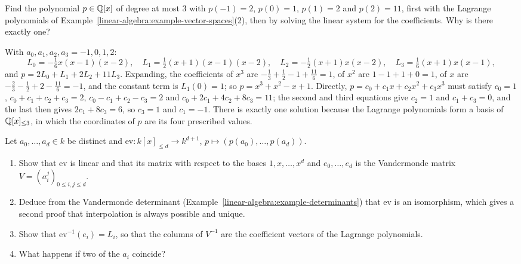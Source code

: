 \begin{exercise}\label{linear-algebra:exercise-lagrange-compute}
Find the polynomial $p \in \mathbb{Q}[x]$ of degree at most $3$ with $p(-1) = 2$, $p(0) = 1$, $p(1) = 2$ and $p(2) = 11$, first with the Lagrange polynomials of Example~\ref{linear-algebra:example-vector-spaces}(2), then by solving the linear
system for the coefficients. Why is there exactly one?
\end{exercise}

\begin{solution}
With $a_0, a_1, a_2, a_3 = -1, 0, 1, 2$:
\[
L_0 = -\tfrac16x(x - 1)(x - 2), \quad L_1 = \tfrac12(x + 1)(x - 1)(x - 2), \quad L_2 = -\tfrac12(x + 1)x(x - 2), \quad L_3 = \tfrac16(x + 1)x(x - 1),
\]
and $p = 2L_0 + L_1 + 2L_2 + 11L_3$. Expanding, the coefficients of $x^3$ are $-\frac13 + \frac12 - 1 + \frac{11}6 = 1$, of $x^2$ are $1 - 1 + 1 + 0 = 1$, of $x$ are $-\frac23 - \frac12 + 2 - \frac{11}6 = -1$, and the constant
term is $L_1(0) = 1$; so $p = x^3 + x^2 - x + 1$. Directly, $p = c_0 + c_1x + c_2x^2 + c_3x^3$ must satisfy $c_0 = 1$, $c_0 + c_1 + c_2 + c_3 = 2$, $c_0 - c_1 + c_2 - c_3 = 2$ and
$c_0 + 2c_1 + 4c_2 + 8c_3 = 11$; the second and third equations give $c_2 = 1$ and $c_1 + c_3 = 0$, and the last then gives $2c_1 + 8c_3 = 6$, so $c_3 = 1$ and $c_1 = -1$. There is exactly one solution because
the Lagrange polynomials form a basis of $\mathbb{Q}[x]_{\leq 3}$, in which the coordinates of $p$ are its four prescribed values.
\end{solution}

\begin{exercise}\label{linear-algebra:exercise-lagrange-vandermonde}
Let $a_0, \ldots, a_d \in k$ be distinct and $\mathrm{ev} \colon k[x]_{\leq d} \to k^{d+1}$, $p \mapsto (p(a_0), \ldots, p(a_d))$.
\begin{enumerate}
\item Show that $\mathrm{ev}$ is linear and that its matrix with respect to the bases $1, x, \ldots, x^d$ and $e_0, \ldots, e_d$ is the Vandermonde matrix $V = (a_i^j)_{0 \leq i, j \leq d}$.
\item Deduce from the Vandermonde determinant (Example~\ref{linear-algebra:example-determinants}) that $\mathrm{ev}$ is an isomorphism, which gives a second proof that interpolation is always possible and unique.
\item Show that $\mathrm{ev}^{-1}(e_i) = L_i$, so that the columns of $V^{-1}$ are the coefficient vectors of the Lagrange polynomials.
\item What happens if two of the $a_i$ coincide?
\end{enumerate}
\end{exercise}

